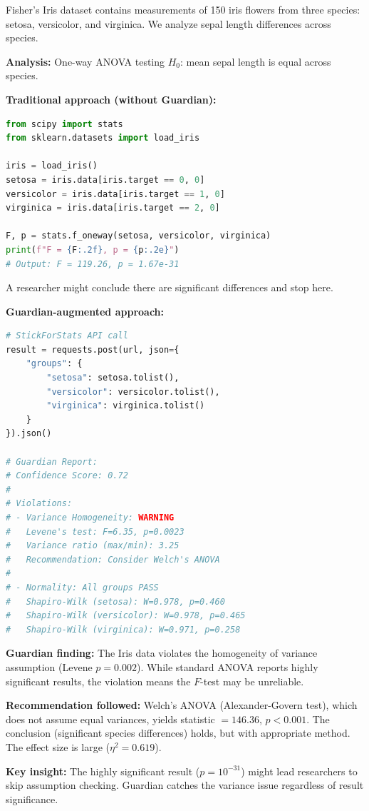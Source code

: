 \documentclass[article]{jss}
\begin{document}
Fisher's Iris dataset \citep{fisher1936use} contains measurements of 150 iris flowers from three species: setosa, versicolor, and virginica. We analyze sepal length differences across species.

\textbf{Analysis:} One-way ANOVA testing $H_0$: mean sepal length is equal across species.

\textbf{Traditional approach (without Guardian):}
\begin{lstlisting}[language=Python]
from scipy import stats
from sklearn.datasets import load_iris

iris = load_iris()
setosa = iris.data[iris.target == 0, 0]
versicolor = iris.data[iris.target == 1, 0]
virginica = iris.data[iris.target == 2, 0]

F, p = stats.f_oneway(setosa, versicolor, virginica)
print(f"F = {F:.2f}, p = {p:.2e}")
# Output: F = 119.26, p = 1.67e-31
\end{lstlisting}

A researcher might conclude there are significant differences and stop here.

\textbf{Guardian-augmented approach:}

\begin{lstlisting}[language=Python]
# StickForStats API call
result = requests.post(url, json={
    "groups": {
        "setosa": setosa.tolist(),
        "versicolor": versicolor.tolist(),
        "virginica": virginica.tolist()
    }
}).json()

# Guardian Report:
# Confidence Score: 0.72
#
# Violations:
# - Variance Homogeneity: WARNING
#   Levene's test: F=6.35, p=0.0023
#   Variance ratio (max/min): 3.25
#   Recommendation: Consider Welch's ANOVA
#
# - Normality: All groups PASS
#   Shapiro-Wilk (setosa): W=0.978, p=0.460
#   Shapiro-Wilk (versicolor): W=0.978, p=0.465
#   Shapiro-Wilk (virginica): W=0.971, p=0.258
\end{lstlisting}

\textbf{Guardian finding:} The Iris data violates the homogeneity of variance assumption (Levene $p = 0.002$). While standard ANOVA reports highly significant results, the violation means the $F$-test may be unreliable.

\textbf{Recommendation followed:} Welch's ANOVA (Alexander-Govern test), which does not assume equal variances, yields statistic $= 146.36$, $p < 0.001$. The conclusion (significant species differences) holds, but with appropriate method. The effect size is large ($\eta^2 = 0.619$).

\textbf{Key insight:} The highly significant result ($p = 10^{-31}$) might lead researchers to skip assumption checking. Guardian catches the variance issue regardless of result significance.
\end{document}
